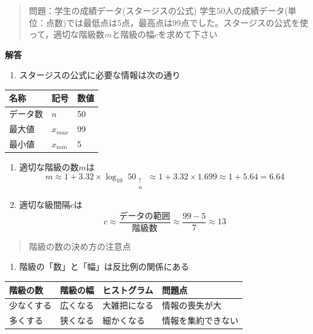 \documentclass[
]{book}
\providecommand{\tightlist}{%
  \setlength{\itemsep}{0pt}\setlength{\parskip}{0pt}}
\theoremstyle{definition}
\theoremstyle{definition}
\theoremstyle{definition}
\theoremstyle{definition}
\theoremstyle{remark}
\begin{document}
\begin{quote}
問題：学生の成績データ(スタージスの公式)
学生50人の成績データ(単位：点数)では最低点は5点，最高点は99点でした。スタージスの公式を使って，適切な階級数\(m\)と階級の幅\(c\)を求めて下さい
\end{quote}

\textbf{解答}

\begin{enumerate}
\def\labelenumi{\arabic{enumi}.}
\tightlist
\item
  スタージスの公式に必要な情報は次の通り
\end{enumerate}

\begin{longtable}[]{@{}lll@{}}
\toprule()
名称 & 記号 & 数値 \\
\midrule()
\endhead
データ数 & \(n\) & 50 \\
最大値 & \(x_{max}\) & 99 \\
最小値 & \(x_{min}\) & 5 \\
\bottomrule()
\end{longtable}

\begin{enumerate}
\def\labelenumi{\arabic{enumi}.}
\setcounter{enumi}{1}
\item
  適切な階級の数\(m\)は
  \[
  m 
  \approx 1+3.32 \times \log_{10} \mathop{50}_{\substack{\uparrow \\ n}}
  \approx 1+3.32 \times 1.699
  \approx 1+5.64 = 6.64
  \]
\item
  適切な級間隔\(c\)は
  \[
  c 
  \approx \frac{\text{データの範囲}}{\text{階級数}}
  \approx \frac{99-5}{7} 
  \approx 13
  \]
\end{enumerate}

\begin{quote}
階級の数の決め方の注意点
\end{quote}

\begin{enumerate}
\def\labelenumi{\arabic{enumi}.}
\tightlist
\item
  階級の「数」と「幅」は反比例の関係にある
\end{enumerate}

\begin{longtable}[]{@{}llll@{}}
\toprule()
階級の数 & 階級の幅 & ヒストグラム & 問題点 \\
\midrule()
\endhead
少なくする & 広くなる & 大雑把になる & 情報の喪失が大 \\
多くする & 狭くなる & 細かくなる & 情報を集約できない \\
\bottomrule()
\end{longtable}
\end{document}
